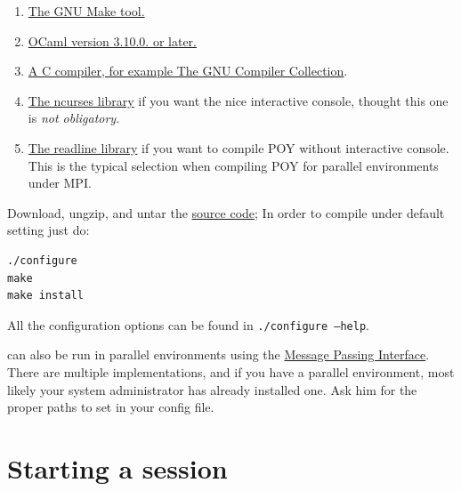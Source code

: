 \begin{enumerate}
    \item \href{http://www.gnu.org/software/make/}{The GNU Make tool.}
    \item \href{http://www.ocaml.org}{OCaml version 3.10.0. or later.}
    \item \href{http://gcc.gnu.org/}{A C compiler, for example The GNU Compiler Collection}.
    \item \href{http://www.gnu.org/software/ncurses/}{The ncurses library} if
        you want the nice interactive console, thought this one is
        \emph{not obligatory}.
    \item \href{http://tiswww.case.edu/php/chet/readline/rltop.html}{The
        readline library} if you want
        to compile POY without interactive console. This is the typical
        selection when compiling POY for parallel environments under MPI.
\end{enumerate}

Download, ungzip, and untar the
\href{http://research.amnh.org/scicomp/projects/poy.php}{\poy source code};
In order to compile under default setting just do:
\begin{verbatim}
./configure
make
make install
\end{verbatim}
All the configuration options can be found in {\tt ./configure --help}.

\poy can also be run in parallel environments using the
\href{http://www-unix.mcs.anl.gov/mpi/}{Message Passing Interface}. There are
multiple implementations, and if you have a parallel environment, most likely
your system administrator has already installed one. Ask him for the proper
paths to set in your config file.

\section{Starting a \poy session}

